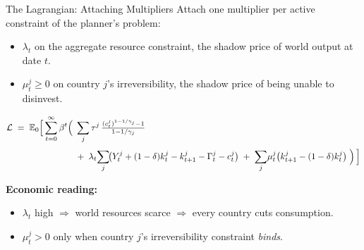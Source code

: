 \documentclass[aspectratio=169,11pt]{beamer}
\newcommand{\emphc}[1]{\textcolor{harvardcrimson}{#1}}
\begin{document}
\begin{frame}{The Lagrangian: Attaching Multipliers}
\footnotesize
Attach one multiplier per active constraint of the planner's problem:
\begin{itemize}\itemsep2pt
    \item $\lambda_t$ on the aggregate resource constraint, the \emphc{shadow price of world output} at date $t$.
    \item $\mu_t^j \geq 0$ on country $j$'s irreversibility, the \emphc{shadow price of being unable to disinvest}.
\end{itemize}

\[
\begin{aligned}
\mathcal{L} \;=\; \mathbb{E}_0\Bigl[\, \sum_{t=0}^{\infty} \beta^{t}\Bigl(\;
  &\sum_{j} \tau^j \,\tfrac{(c_t^j)^{1-1/\gamma_j} - 1}{1-1/\gamma_j}\\[3pt]
  &{}+\; \lambda_t\!\sum_{j}\!\bigl(Y_t^j + (1-\delta) k_t^j - k_{t+1}^j - \Gamma_t^j - c_t^j\bigr)
   \;+\; \sum_{j}\! \mu_t^j \bigl(k_{t+1}^j - (1-\delta) k_t^j\bigr)
\;\Bigr)\,\Bigr]
\end{aligned}
\]

\smallskip
\textbf{Economic reading:}
\begin{itemize}\itemsep1pt
    \item $\lambda_t$ high $\Rightarrow$ world resources scarce $\Rightarrow$ every country cuts consumption.
    \item $\mu_t^j > 0$ only when country $j$'s irreversibility constraint \emph{binds}.
\end{itemize}
\end{frame}
\end{document}
